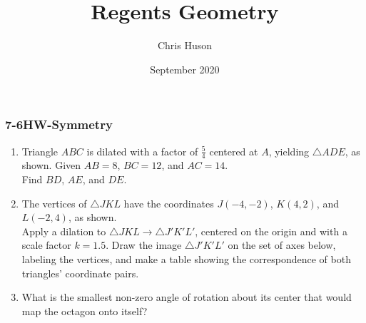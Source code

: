 \documentclass[12pt, twoside]{article}
\title{Regents Geometry}
\author{Chris Huson}
\date{September 2020}
\begin{document}
\subsubsection*{7-6HW-Symmetry}
\begin{enumerate}
\item Triangle $ABC$ is dilated with a factor of $\frac{5}{4}$ centered at $A$, yielding $\triangle ADE$, as shown. Given $AB=8$, $BC=12$, and $AC=14$. \\[0.25cm] Find $BD$, $AE$, and $DE$. \vspace{1cm}
  \begin{flushright}
    \end{flushright}

\item The vertices of $\triangle JKL$ have the coordinates $J(-4,-2)$, $K(4,2)$, and $L(-2,4)$, as shown. \\[0.25cm]
  Apply a dilation to $\triangle JKL \rightarrow \triangle J'K'L'$, centered on the origin and with a scale factor $k=1.5$. Draw the image $\triangle J'K'L'$ on the set of axes below, labeling the vertices, and make a table showing the correspondence of both triangles' coordinate pairs.
    \begin{flushright}
    \end{flushright}

\newpage
\item What is the smallest non-zero angle of rotation about its center that would map the octagon onto itself? \vspace{0.25cm}
  \begin{center}
    \end{center}


\end{enumerate}
\end{document}

